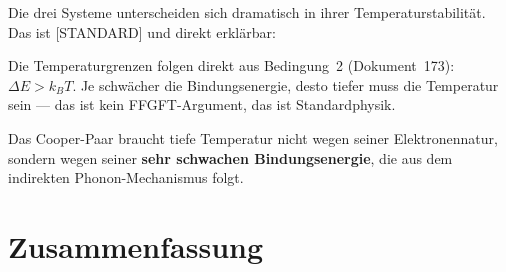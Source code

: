 Die drei Systeme unterscheiden sich dramatisch in ihrer
Temperaturstabilität. Das ist [STANDARD] und direkt erklärbar:

\begin{center}
\end{center}

\begin{keypoint}
Die Temperaturgrenzen folgen direkt aus Bedingung~2
(Dokument~173): $\Delta E > k_BT$.
Je schwächer die Bindungsenergie, desto tiefer muss
die Temperatur sein --- das ist kein FFGFT-Argument,
das ist Standardphysik.

Das Cooper-Paar braucht tiefe Temperatur nicht wegen
seiner Elektronennatur, sondern wegen seiner
\textbf{sehr schwachen Bindungsenergie},
die aus dem indirekten Phonon-Mechanismus folgt.
\end{keypoint}

\section{Zusammenfassung}
\label{sec:zusammenfassung-179}

